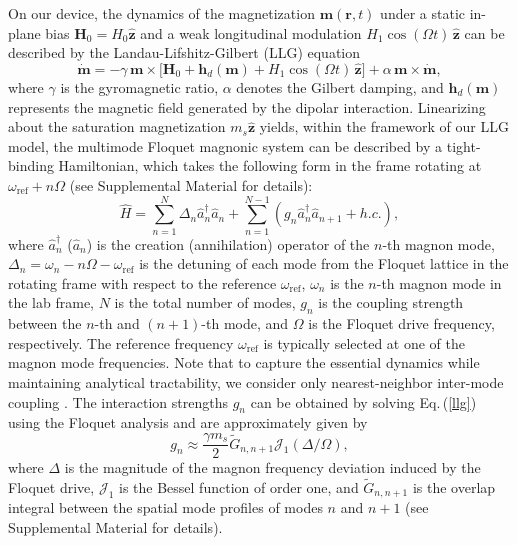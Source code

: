 \documentclass[
twocolumn,

superscriptaddress,









 amsmath,amssymb,
 aps,


prl,




]{revtex4-2}
\begin{document}
On our device, the dynamics of the magnetization \(\mathbf m(\mathbf r,t)\) under a static in-plane bias \(\mathbf H_0=H_0\hat{\mathbf z}\) and a weak longitudinal modulation \(H_1\cos(\Omega t)\,\hat{\mathbf z}\) can be described by the  Landau-Lifshitz-Gilbert (LLG) equation
\begin{equation}
\dot{\mathbf m}=-\gamma\,\mathbf m\times\!\big[\mathbf H_0+\mathbf h_d(\mathbf m)+H_1\cos(\Omega t)\,\hat{\mathbf z}\big]+\alpha\,\mathbf m\times\dot{\mathbf m},\label{llg}
\end{equation}
where $\gamma$ is the gyromagnetic ratio, $\alpha$ denotes the Gilbert damping, and $\mathbf{h}_d(\mathbf{m})$ represents the magnetic field generated by the dipolar interaction. Linearizing about the saturation magnetization $m_s\hat{\mathbf z}$ yields, within the framework of our LLG model, the multimode Floquet magnonic system can be described by a tight-binding Hamiltonian, which takes the following form in the frame rotating at $\omega_\mathrm{ref}+n\Omega$ (see Supplemental Material \cite{SM} for details):
\begin{equation}
    \hat{H}=\sum_{n=1}^{N}\Delta_n\hat{a}_n^\dagger\hat{a}_n+\sum_{n=1}^{N-1}(g_n\hat{a}_n^\dagger \hat{a}_{n+1}+h.c.),
\label{Eq:Hamiltonian_RWA}
\end{equation}
\noindent
where $\hat{a}_n^\dagger$ ($\hat{a}_n$) is the creation (annihilation) operator of the $n$-th magnon mode, $\Delta_n=\omega_n-n\Omega-\omega_\mathrm{ref}$ is the detuning of each mode from the Floquet lattice in the rotating frame with respect to the reference $\omega_\mathrm{ref}$, $\omega_n$ is the $n$-th magnon mode in the lab frame, $N$ is the total number of modes, $g_n$ is the coupling strength between the $n$-th and $(n+1)$-th mode, and $\Omega$ is the Floquet drive frequency, respectively. The reference frequency $\omega_\mathrm{ref}$ is typically selected at one of the magnon mode frequencies. Note that to capture the essential dynamics while maintaining analytical tractability, we consider only nearest-neighbor inter-mode coupling \cite{SM}. The interaction strengths $g_n$ can be obtained by solving Eq.\,(\ref{llg}) using the Floquet analysis and are approximately given by
\begin{equation}
    g_n\approx \frac{\gamma m_s}{2}\tilde{G}_{n,n+1}\mathcal{J}_1(\Delta/\Omega),
\end{equation}
where $\Delta$ is the magnitude of the magnon frequency deviation induced by the Floquet drive, $\mathcal{J}_1$ is the Bessel function of order one, and $\tilde{G}_{n,n+1}$ is the overlap integral between the spatial mode profiles of modes $n$ and $n+1$ (see Supplemental Material  \cite{SM} for details).
\end{document}
